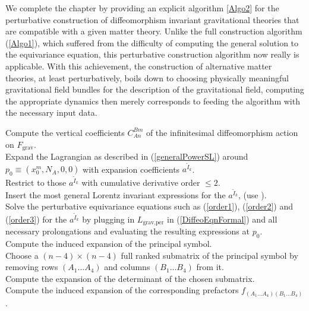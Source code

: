 We complete the chapter by providing an explicit algorithm \ref{Algo2} for the perturbative construction of diffeomorphism invariant gravitational theories that are compatible with a given matter theory. 
Unlike the full construction algorithm (\ref{Algo1}), which suffered from the difficulty of computing the general solution to the equivariance equation, this perturbative construction algorithm now really is applicable. 
With this achievement, the construction of alternative matter theories, at least perturbatively, boils down to choosing physically meaningful gravitational field bundles for the description of the gravitational field, computing the appropriate dynamics then merely corresponds to feeding the algorithm with the necessary input data.  
\begin{algorithm}[hbt!]
\SetAlgoLined
{}
Compute the vertical coefficients $C^{Bm}_{An}$ of the infinitesimal diffeomorphism action on $F_{\text{grav}}$. \\
Expand the Lagrangian as described in (\ref{generalPowerSL}) around $p_0 \equiv (x_0^m,N_A,0,0)$ with expansion coefficients $a^{\tilde{I}_k}$.\\
Restrict to those $a^{\tilde{I}_k}$ with cumulative derivative order $\leq 2$.\\
Insert the most general Lorentz invariant expressions for the $a^{\tilde{I}_k}$, (use \cite{sparse-tensor}).\\
Solve the perturbative equivariance equations such as (\ref{order1}), (\ref{order2}) and (\ref{order3}) for the $a^{\tilde{I}_k}$ by plugging in $L_{\text{grav,per}}$ in (\ref{DiffeoEqnFormal}) and all necessary prolongations and evaluating the resulting expressions at $p_0$.\\
Compute the induced expansion of the principal symbol.\\
Choose a $(n-4) \times (n-4)$ full ranked submatrix of the principal symbol by removing rows $(A_1...A_4)$ and columns $(B_1...B_4)$ from it. \\
Compute the expansion of the determinant of the chosen submatrix.\\
Compute the induced expansion of the corresponding prefactors $f_{(A_1...A_4)(B_1...B_4)}$. \\

\end{algorithm}

